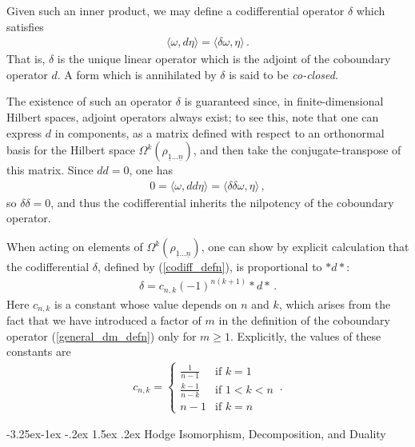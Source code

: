 \documentclass[12pt]{article}
\makeatletter
\newcommand{\ul}[1]{{\underline{#1}}}
\renewcommand\subsection{\@startsection{subsection}{2}{\z@}%
                                     {-3.25ex\@plus -1ex \@minus -.2ex}%
                                     {1.5ex \@plus .2ex}%
                                     {\normalfont\bfseries}}
\numberwithin{equation}{section}
\newcommand{\rhooneton}{{\rho_{\ul{1} \ldots \ul{n}}}}
\makeatother
\begin{document}
Given such an inner product, we may define a codifferential operator $\delta$ which satisfies
%
\begin{align}\label{codiff_defn}
    \langle \omega, d \eta \rangle = \langle \delta \omega, \eta \rangle \, .
\end{align}
%
That is, $\delta$ is the unique linear operator which is the adjoint of the coboundary operator $d$. A form which is annihilated by $\delta$ is said to be \emph{co-closed}.

The existence of such an operator $\delta$ is guaranteed since, in finite-dimensional Hilbert spaces, adjoint operators always exist; to see this, note that one can express $d$ in components, as a matrix defined with respect to an orthonormal basis for the Hilbert space $\Omega^k ( \rhooneton )$, and then take the conjugate-transpose of this matrix. Since $dd = 0$, one has
%
\begin{align}
    0 = \langle \omega , d d \eta \rangle = \langle \delta \delta \omega , \eta \rangle \, ,
\end{align}
%
so $\delta \delta = 0$, and thus the codifferential inherits the nilpotency of the coboundary operator.

When acting on elements of $\Omega^k ( \rhooneton )$, one can show by explicit calculation that the codifferential $\delta$, defined by (\ref{codiff_defn}), is proportional to $\ast d \ast$:
%
\begin{align}\label{delta_to_stardstar}
    \delta = c_{n, k} \left( - 1 \right)^{n ( k + 1 ) } \ast d \ast \, .
\end{align}
%
Here $c_{n, k}$ is a constant whose value depends on $n$ and $k$, which arises from the fact that we have introduced a factor of $m$ in the definition of the coboundary operator (\ref{general_dm_defn}) only for $m \geq 1$. Explicitly, the values of these constants are
%
%
\begin{align}\label{cnk_defn}
    c_{n, k} = \begin{cases} \frac{1}{n - 1} &\text{if } k = 1 \\ \frac{k - 1}{ n - k } &\text{if } 1 < k < n \\ n - 1 &\text{if } k = n \end{cases} \, .
\end{align}
%


\subsection{Hodge Isomorphism, Decomposition, and Duality}
\end{document}
